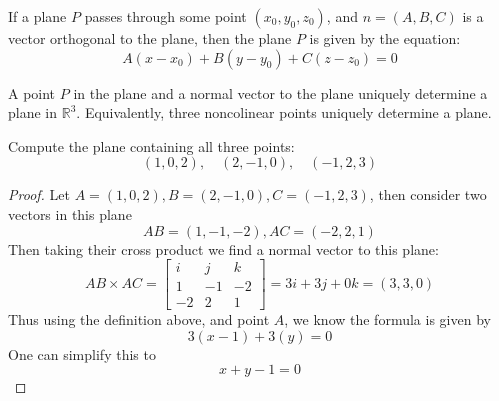 \documentclass[openany]{book}
\newcommand{\R}{\mathbb{R}}
\begin{document}
\begin{defn}[Plane in $\R^3$]\label{plane}
    If a plane ${P}$ passes through some point $(x_0,y_0,z_0)$, and $n=(A,B,C)$ is a vector orthogonal to the plane, then the plane ${P}$ is given by the equation:
     \begin{equation*}
         A(x-x_0)+B(y-y_0)+C(z-z_0)=0
     \end{equation*}
     \begin{remark}
        A point ${P}$ in the plane and a normal vector to the plane uniquely determine a plane in $\R^3$. Equivalently, three noncolinear points uniquely determine a plane.
     \end{remark}
 \end{defn}
 \begin{prob}
    Compute the plane containing all three points:
    \begin{equation*}
        (1,0,2), \quad (2, -1, 0), \quad (-1, 2, 3)
    \end{equation*}
 \end{prob}
 \begin{proof}
    Let $A=(1,0,2), B=(2, -1, 0), C=(-1, 2, 3)$, then consider two vectors in this plane 
    \begin{equation*}
        AB=(1,-1,-2), AC=(-2,2,1)
    \end{equation*}
    Then taking their cross product we find a normal vector to this plane:
    \begin{equation*}
        AB\times AC=\begin{bmatrix}
            i&j&k\\
            1&-1&-2\\
            -2&2&1
        \end{bmatrix}=3i+3j+0k=(3,3,0)
    \end{equation*}
    Thus using the definition above, and point $A$, we know the formula is given by 
    \begin{equation*}
        3(x-1)+3(y)=0
    \end{equation*}
    One can simplify this to 
    \begin{equation*}
        x+y-1=0
    \end{equation*}
\end{proof}
\end{document}
